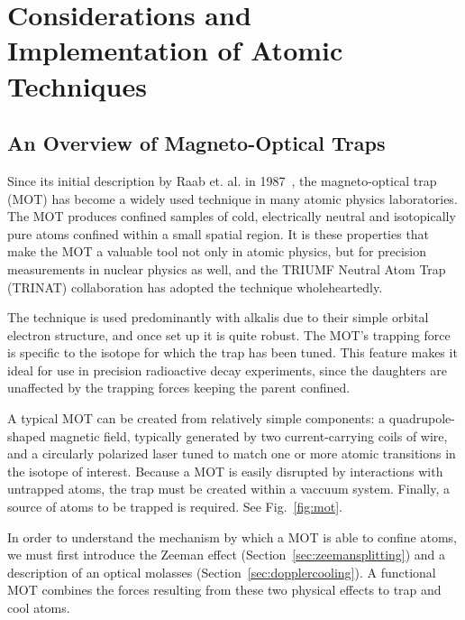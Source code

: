 %
%
%
\clearpage
\chapter{Considerations and Implementation of Atomic Techniques}
\label{atomicphysics_chapter}
\section{An Overview of Magneto-Optical Traps}
\label{section:mot}
Since its initial description by Raab et. al. in 1987~\cite{raabprentiss}, the magneto-optical trap (MOT) has become a widely used technique in many atomic physics laboratories. The MOT produces confined samples of cold, electrically neutral and isotopically pure atoms confined within a small spatial region.  It is these properties that make the MOT a valuable tool not only in atomic physics, but for precision measurements in nuclear physics as well, and the TRIUMF Neutral Atom Trap (TRINAT) collaboration has adopted the technique wholeheartedly.

The technique is used predominantly with alkalis due to their simple orbital electron structure, and once set up it is quite robust.  The MOT's trapping force is specific to the isotope for which the trap has been tuned. This feature makes it ideal for use in precision radioactive decay experiments, since the daughters are unaffected by the trapping forces keeping the parent confined.

A typical MOT can be created from relatively simple components:  a quadrupole-shaped magnetic field, typically generated by two current-carrying coils of wire, and a circularly polarized laser tuned to match one or more atomic transitions in the isotope of interest.  Because a MOT is easily disrupted by interactions with untrapped atoms, the trap must be created within a vaccuum system.  Finally, a source of atoms to be trapped is required.  See Fig.~\ref{fig:mot}.

In order to understand the mechanism by which a MOT is able to confine atoms, we must first introduce the Zeeman effect (Section~\ref{sec:zeemansplitting}) and a description of an optical molasses (Section~\ref{sec:dopplercooling}). A functional MOT combines the forces resulting from these two physical effects to trap and cool atoms.


